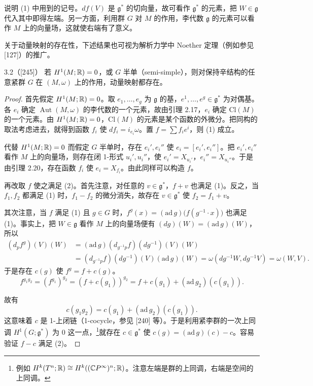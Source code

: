 说明 (1) 中用到的记号。$df(V)$ 是 $\mathfrak{g}^*$ 的切向量，故可看作 $\mathfrak{g}^*$ 的元素，把 $W\in\mathfrak{g}$ 代入其中即得左端。另一方面，利用群 $G$ 对 $M$ 的作用，李代数 $\mathfrak{g}$ 的元素可以看作 $M$ 上的向量场，这就使右端有了意义。

关于动量映射的存在性，下述结果也可视为解析力学中 Noether 定理（例如参见 [127]）的推广。

\begin{theorem*}{3.2（[245]）}
  若 $H^1(M;\mathbb{R})=0$，或 $G$ 半单（semi-simple），则对保持辛结构的任意紧群 $G$ 在 $(M,\omega)$ 上的作用，动量映射都存在。
\end{theorem*}

\begin{proof}
  首先假定 $H^1(M;\mathbb{R})=0$。取 $e_1,\dots,e_g$ 为 $\mathfrak{g}$ 的基，$e^1,\dots,e^g\in\mathfrak{g}^*$ 为对偶基。各 $e_i$ 确定 $\operatorname{Aut}(M,\omega)$ 的李代数的一个元素，故由引理 2.17，$e_i$ 确定 $\mathrm{Cl}(M)$ 的一个元素。由 $H^1(M;\mathbb{R})=0$，$\mathrm{Cl}(M)$ 的元素是某个函数的外微分。把同构的取法考虑进去，就得到函数 $f_i$ 使 $df_i=i_{e_i}\omega$。置 $f=\sum f_ie^i$，则 (1) 成立。

  代替 $H^1(M;\mathbb{R})=0$ 而假定 $G$ 半单时，存在 $e_i',e_i''$ 使 $e_i=[e_i',e_i'']$。把 $e_i',e_i''$ 看作 $M$ 上的向量场，则存在闭 1-形式 $u_i',u_i''$，使 $e_i'=X_{u_i'}$，$e_i''=X_{u_i''}$。于是由引理 2.20，存在函数 $f_i$ 使 $e_i=X_{f_i}$。由此同样可以构造 $f$。

  再改取 $f$ 使之满足 (2)。首先注意，对任意的 $v\in\mathfrak{g}^*$，$f+v$ 也满足 (1)。反之，当 $f_1,f_2$ 都满足 (1) 时，$f_1-f_2$ 的微分消失，故存在 $v\in\mathfrak{g}^*$ 使 $f_2=f_1+v$。

  其次注意，当 $f$ 满足 (1) 且 $g\in G$ 时，$f^g(x)=(\mathrm{ad}\,g)\bigl(f(g^{-1}\cdot x)\bigr)$ 也满足 (1)。事实上，把 $W\in\mathfrak{g}$ 看作 $M$ 上的向量场便有 $(dg)(W)=(\mathrm{ad}\,g)(W)$，所以
  \begin{align*}
    (d_pf^g)(V)(W) &= (\mathrm{ad}\,g)(d_{g^{-1}p}f)(dg^{-1})(V)(W)\\
    &= (d_{g^{-1}p}f)(dg^{-1})(V)(\mathrm{ad}\,g)(W)
     =\omega(dg^{-1}W,dg^{-1}V)=\omega(W,V).
  \end{align*}
  于是存在 $c(g)$ 使 $f^g=f+c(g)$。
  \[
    f^{g_1g_2}=(f^{g_1})^{g_2}=(f+c(g_1))^{g_2}=f+c(g_1)+(\mathrm{ad}\,g_2)(c(g_1)).
  \]

  故有
  \[
    c(g_1g_2)=c(g_1)+(\mathrm{ad}\,g_2)(c(g_1)).
  \]
  这意味着 $c$ 是 1-上闭链（1-cocycle，参见 [240] 等）。于是利用紧李群的一次上同调 $H^1(G;\mathfrak{g}^*)$ 为 0 这一点，\footnote{例如 $H^k(T^n;\mathbb{R})\cong H^k((\mathbb{C}P^\infty)^n;\mathbb{R})$。注意左端是群的上同调，右端是空间的上同调。}就存在 $c\in\mathfrak{g}^*$ 使 $c(g)=(\mathrm{ad}\,g)(c)-c$。容易验证 $f-c$ 满足 (2)。
\end{proof}

